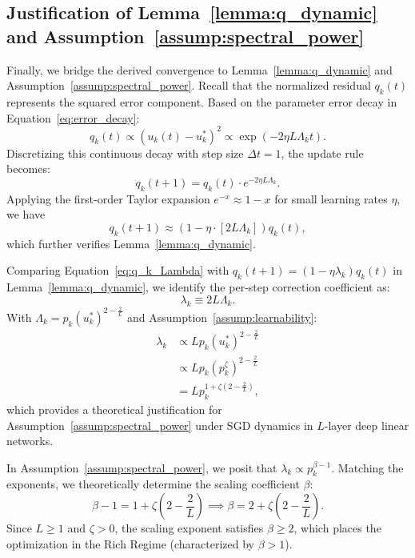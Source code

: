 \documentclass{article}
\theoremstyle{plain}
\theoremstyle{definition}
\theoremstyle{remark}
\begin{document}
\subsection{Justification of Lemma~\ref{lemma:q_dynamic} and Assumption~\ref{assump:spectral_power}}
Finally, we bridge the derived convergence to Lemma~\ref{lemma:q_dynamic} and Assumption~\ref{assump:spectral_power}.
Recall that the normalized residual $q_k(t)$ represents the squared error component. Based on the parameter error decay in Equation~\eqref{eq:error_decay}:
\begin{equation*}
    q_k(t) \propto (u_k(t) - u_k^*)^2 \propto  \exp\left(- 2 \eta L \Lambda_k t\right).
\end{equation*}
Discretizing this continuous decay with step size $\Delta t = 1$, the update rule becomes:
\begin{equation*}
    q_k(t+1) = q_k(t) \cdot e^{- 2 \eta L \Lambda_k}.
\end{equation*}
Applying the first-order Taylor expansion $e^{-x} \approx 1 - x$ for small learning rates $\eta$, we have
\begin{equation}\label{eq:q_k_Lambda}
    q_k(t+1) \approx (1 - \eta \cdot [2 L \Lambda_k]) q_k(t),
\end{equation}
which further verifies Lemma~\ref{lemma:q_dynamic}.

Comparing Equation~\eqref{eq:q_k_Lambda} with $q_k(t+1) = (1 - \eta \lambda_k) q_k(t)$ in Lemma~\ref{lemma:q_dynamic}, we identify the per-step correction coefficient as:
\begin{equation*}
    \lambda_k \equiv 2 L \Lambda_k.
\end{equation*}
With $\Lambda_k = p_k (u_k^*)^{2 - \frac{2}{L}}$ and Assumption~\ref{assump:learnability}:
\begin{align*}
    \lambda_k &\propto L p_k (u_k^*)^{2 - \frac{2}{L}}  \\
              &\propto L p_k (p_k^\zeta)^{2 - \frac{2}{L}} \\
              &= L p_k^{1 + \zeta(2 - \frac{2}{L})},
\end{align*}
which provides a theoretical justification for Assumption~\ref{assump:spectral_power} under SGD dynamics in $L$-layer deep linear networks.

In Assumption~\ref{assump:spectral_power}, we posit that $\lambda_k \propto p_k^{\beta - 1}$. Matching the exponents, we theoretically determine the scaling coefficient $\beta$:
\begin{equation}
    \beta - 1 = 1 + \zeta \left( 2 - \frac{2}{L} \right) \implies \beta = 2 + \zeta \left( 2 - \frac{2}{L} \right).
\end{equation}
Since $L \ge 1$ and $\zeta > 0$, the scaling exponent satisfies $\beta \ge 2$, which places the optimization in the Rich Regime (characterized by $\beta > 1$). 
\end{document}
